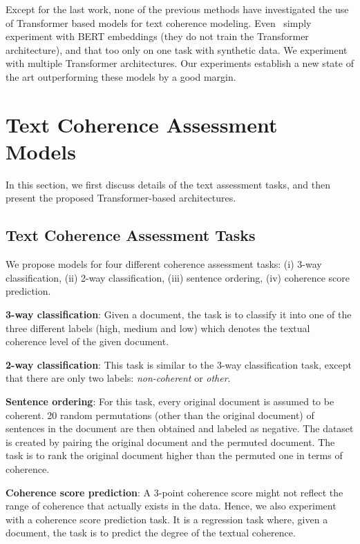 \documentclass[11pt]{article}
\begin{document}
Except for the last work, none of the previous methods have investigated the use of Transformer based models for text coherence modeling. Even~\cite{farag2020analyzing} simply experiment with BERT embeddings (they do not train the Transformer architecture), and that too only on one task with synthetic data. We experiment with multiple Transformer architectures. Our experiments establish a new state of the art outperforming these models by a good margin.

\section{Text Coherence Assessment Models}
\label{sec:approach}
In this section, we first discuss details of the text assessment tasks, and then present the proposed Transformer-based architectures.

\subsection{Text Coherence Assessment Tasks}
\label{subsec:text_assessment}
We propose models for four different coherence assessment tasks: (i) 3-way classification, (ii) 2-way classification, (iii) sentence ordering, (iv) coherence score prediction.

\noindent\textbf{3-way classification}: Given a document, the task is to classify it into one of the three different labels (high, medium and low) which denotes the textual coherence level of the given document.

\noindent\textbf{2-way classification}: This task is similar to the 3-way classification task, except that there are only two labels: \textit{non-coherent} or \textit{other}. 

\noindent\textbf{Sentence ordering}: For this task, every original document is assumed to be coherent. 20 random permutations (other than the original document) of sentences in the document are then obtained and labeled as negative. The dataset is created by pairing the original document and the permuted document. The task is to rank the original document higher than the permuted one in terms of coherence.

\noindent\textbf{Coherence score prediction}: A 3-point coherence score might not reflect the range of coherence that actually exists in the data. Hence, we also experiment with a coherence score prediction task. It is a regression task where, given a document, the task is to predict the degree of the textual coherence.
\end{document}
